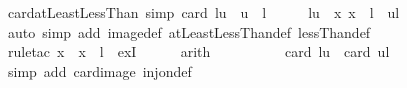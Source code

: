 \begin{isabellebody}
\endisatagproof
{\isafoldproof}%
%
\isadelimproof
\isanewline
%
\endisadelimproof
\isanewline
{}\isamarkupfalse%
\ card{\isacharunderscore}{\kern0pt}atLeastLessThan\ {\isacharbrackleft}{\kern0pt}simp{\isacharbrackright}{\kern0pt}{\isacharcolon}{\kern0pt}\ {\isachardoublequoteopen}card\ {\isacharbraceleft}{\kern0pt}l{\isachardot}{\kern0pt}{\isachardot}{\kern0pt}{\isacharless}{\kern0pt}u{\isacharbraceright}{\kern0pt}\ {\isacharequal}{\kern0pt}\ u\ {\isacharminus}{\kern0pt}\ l{\isachardoublequoteclose}\isanewline
%
\isadelimproof
%
\endisadelimproof
%
\isatagproof
{}\isamarkupfalse%
\ {\isacharminus}{\kern0pt}\isanewline
\ \ \isamarkupfalse%
\ {\isachardoublequoteopen}{\isacharbraceleft}{\kern0pt}l{\isachardot}{\kern0pt}{\isachardot}{\kern0pt}{\isacharless}{\kern0pt}u{\isacharbraceright}{\kern0pt}\ {\isacharequal}{\kern0pt}\ {\isacharparenleft}{\kern0pt}{\isasymlambda}x{\isachardot}{\kern0pt}\ x\ {\isacharplus}{\kern0pt}\ l{\isacharparenright}{\kern0pt}\ {\isacharbackquote}{\kern0pt}\ {\isacharbraceleft}{\kern0pt}{\isachardot}{\kern0pt}{\isachardot}{\kern0pt}{\isacharless}{\kern0pt}u{\isacharminus}{\kern0pt}l{\isacharbraceright}{\kern0pt}{\isachardoublequoteclose}\isanewline
\ \ \ \ \isamarkupfalse%
\ {\isacharparenleft}{\kern0pt}auto\ simp\ add{\isacharcolon}{\kern0pt}\ image{\isacharunderscore}{\kern0pt}def\ atLeastLessThan{\isacharunderscore}{\kern0pt}def\ lessThan{\isacharunderscore}{\kern0pt}def{\isacharparenright}{\kern0pt}\isanewline
\ \ \ \ \isamarkupfalse%
\ {\isacharparenleft}{\kern0pt}rule{\isacharunderscore}{\kern0pt}tac\ x\ {\isacharequal}{\kern0pt}\ {\isachardoublequoteopen}x\ {\isacharminus}{\kern0pt}\ l{\isachardoublequoteclose}\ \ exI{\isacharparenright}{\kern0pt}\isanewline
\ \ \ \ \isamarkupfalse%
\ arith\isanewline
\ \ \ \ \isamarkupfalse%
\isanewline
\ \ \isamarkupfalse%
\ \isamarkupfalse%
\ {\isachardoublequoteopen}card\ {\isacharbraceleft}{\kern0pt}l{\isachardot}{\kern0pt}{\isachardot}{\kern0pt}{\isacharless}{\kern0pt}u{\isacharbraceright}{\kern0pt}\ {\isacharequal}{\kern0pt}\ card\ {\isacharbraceleft}{\kern0pt}{\isachardot}{\kern0pt}{\isachardot}{\kern0pt}{\isacharless}{\kern0pt}u{\isacharminus}{\kern0pt}l{\isacharbraceright}{\kern0pt}{\isachardoublequoteclose}\isanewline
\ \ \ \ \isamarkupfalse%
\ {\isacharparenleft}{\kern0pt}simp\ add{\isacharcolon}{\kern0pt}\ card{\isacharunderscore}{\kern0pt}image\ inj{\isacharunderscore}{\kern0pt}on{\isacharunderscore}{\kern0pt}def{\isacharparenright}{\kern0pt}\isanewline

\end{isabellebody}
